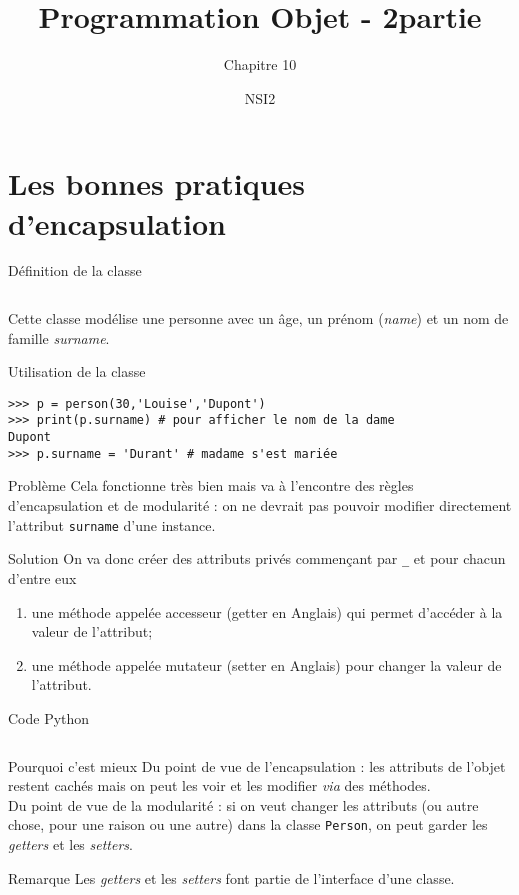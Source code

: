 \documentclass[10pt]{beamer}
\title{Programmation Objet - 2\eme partie}
\subtitle{Chapitre 10}
\author{NSI2}
\begin{document}
\maketitle
\section{Les bonnes pratiques d'encapsulation}

\begin{frame}[fragile]{Définition de la classe}
	\inputminted{python}{scripts/classe1.py}
	Cette classe modélise une personne avec un âge, un prénom (\textit{name}) et un nom de famille \textit{surname}.
\end{frame}

\begin{frame}[fragile]{Utilisation de la classe}

\begin{verbatim}
>>> p = person(30,'Louise','Dupont')
>>> print(p.surname) # pour afficher le nom de la dame
Dupont
>>> p.surname = 'Durant' # madame s'est mariée
\end{verbatim}
\end{frame}
\begin{frame}{Problème}
	Cela fonctionne très bien mais va à l'encontre des règles d'encapsulation et de modularité : on ne devrait pas pouvoir modifier \alert{directement} l'attribut \texttt{surname} d'une instance.
\end{frame}
\begin{frame}{Solution}
On va donc créer des attributs privés commençant par \og\texttt{\_}\fg{} et pour chacun d'entre eux 
\begin{enumerate}[--]
	\item 	une méthode appelée \alert{accesseur} (getter en Anglais) qui permet d'accéder à la valeur de l'attribut;
	\item 	une méthode appelée \alert{mutateur} (setter en Anglais) pour changer la valeur de l'attribut.
\end{enumerate}
\end{frame}
\begin{frame}[fragile]{Code Python}
\inputminted[fontsize=\scriptsize]{python}{scripts/classe2.py}
\end{frame}
\begin{frame}{Pourquoi c'est mieux}
Du point de vue de l'\alert{encapsulation} : les attributs de l'objet restent cachés mais on peut les voir et les modifier \textit{via} des méthodes.\\

Du point de vue de la \alert{modularité} : si on veut changer les attributs (ou autre chose, pour une raison ou une autre) dans la classe \texttt{Person}, on peut garder les \textit{getters} et les \textit{setters}.


\begin{block}{Remarque}
		Les \textit{getters} et les \textit{setters} font partie de l'interface d'une classe.
\end{block}	
\end{frame}
\end{document}
